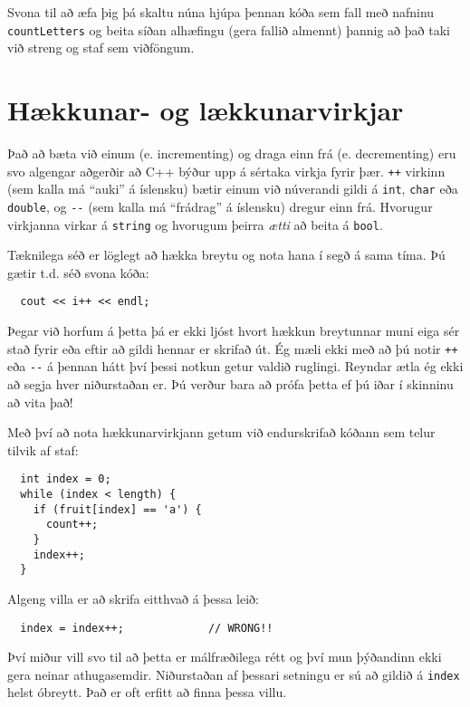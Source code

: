 
Svona til að æfa þig þá skaltu núna hjúpa þennan kóða sem fall með nafninu {\tt countLetters} og beita síðan alhæfingu (gera fallið almennt)
þannig að það taki við streng og staf sem viðföngum.



\section{Hækkunar- og lækkunarvirkjar}

Það að bæta við einum (e. incrementing) og draga einn frá (e. decrementing) eru svo algengar aðgerðir að C++ býður upp á sértaka virkja fyrir þær.
{\tt ++} virkinn (sem kalla má ``auki'' á íslensku) bætir einum við núverandi gildi á {\tt int}, {\tt char} eða {\tt double}, og
\verb+--+ (sem kalla má ``frádrag'' á íslensku) dregur einn frá.
Hvorugur virkjanna virkar á {\tt string} og hvorugum þeirra {\em ætti} að beita á {\tt bool}.

Tæknilega séð er löglegt að hækka breytu og nota hana í segð á sama tíma.
Þú gætir t.d. séð svona kóða: 

\begin{verbatim}
  cout << i++ << endl;
\end{verbatim}
%
Þegar við horfum á þetta þá er ekki ljóst hvort hækkun breytunnar muni eiga sér stað fyrir eða eftir að gildi hennar er skrifað út.
Ég mæli ekki með að þú notir {\tt ++} eða \verb+--+ á þennan hátt því þessi notkun getur valdið ruglingi.
Reyndar ætla ég ekki að segja hver niðurstaðan er.  
Þú verður bara að prófa þetta ef þú iðar í skinninu að vita það!

Með því að nota hækkunarvirkjann getum við endurskrifað kóðann sem telur tilvik af staf:

\begin{verbatim}
  int index = 0;
  while (index < length) {
    if (fruit[index] == 'a') {
      count++;
    }
    index++;
  }
\end{verbatim}
%
Algeng villa er að skrifa eitthvað á þessa leið:

\begin{verbatim}
  index = index++;             // WRONG!!
\end{verbatim}
%
Því miður vill svo til að þetta er málfræðilega rétt og því mun þýðandinn ekki gera neinar athugasemdir.
Niðurstaðan af þessari setningu er sú að gildið á {\tt index} helst óbreytt.
Það er oft erfitt að finna þessa villu.

